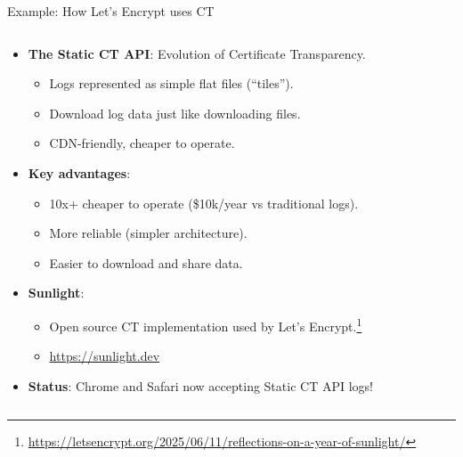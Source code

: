 \documentclass[aspectratio=169, lualatex, handout]{beamer}
\begin{document}
\begin{frame}{Example: How Let's Encrypt uses CT}
	\begin{columns}[c]
		\begin{column}{1\textwidth}
			\begin{itemize}[<+->]
				\item \textbf{The Static CT API}: Evolution of Certificate Transparency.
				      \begin{itemize}
					      \item Logs represented as simple flat files (``tiles'').
					      \item Download log data just like downloading files.
					      \item CDN-friendly, cheaper to operate.
				      \end{itemize}
				\item \textbf{Key advantages}:
				      \begin{itemize}
					      \item 10x+ cheaper to operate (\approx\$10k/year vs traditional logs).
					      \item More reliable (simpler architecture).
					      \item Easier to download and share data.
				      \end{itemize}
				\item \textbf{Sunlight}:
				      \begin{itemize}
					      \item Open source CT implementation used by Let's Encrypt.\footnote{\url{https://letsencrypt.org/2025/06/11/reflections-on-a-year-of-sunlight/}}
					      \item \url{https://sunlight.dev}
				      \end{itemize}
				\item \textbf{Status}: Chrome and Safari now accepting Static CT API logs!
			\end{itemize}
		\end{column}
	\end{columns}
\end{frame}
\end{document}
